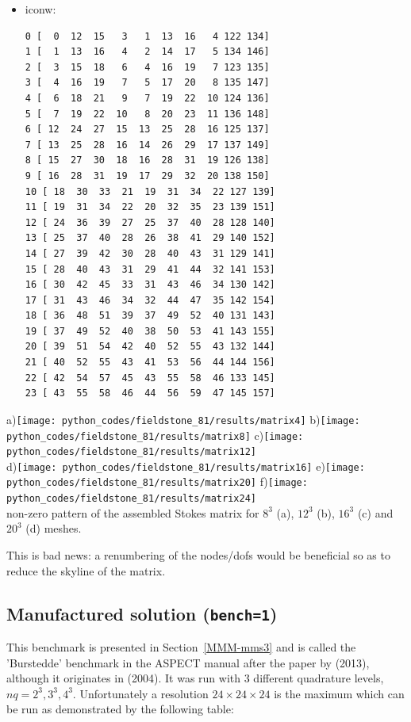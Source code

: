\begin{itemize}
\item iconw:
\begin{verbatim}
0 [  0  12  15   3   1  13  16   4 122 134]
1 [  1  13  16   4   2  14  17   5 134 146]
2 [  3  15  18   6   4  16  19   7 123 135]
3 [  4  16  19   7   5  17  20   8 135 147]
4 [  6  18  21   9   7  19  22  10 124 136]
5 [  7  19  22  10   8  20  23  11 136 148]
6 [ 12  24  27  15  13  25  28  16 125 137]
7 [ 13  25  28  16  14  26  29  17 137 149]
8 [ 15  27  30  18  16  28  31  19 126 138]
9 [ 16  28  31  19  17  29  32  20 138 150]
10 [ 18  30  33  21  19  31  34  22 127 139]
11 [ 19  31  34  22  20  32  35  23 139 151]
12 [ 24  36  39  27  25  37  40  28 128 140]
13 [ 25  37  40  28  26  38  41  29 140 152]
14 [ 27  39  42  30  28  40  43  31 129 141]
15 [ 28  40  43  31  29  41  44  32 141 153]
16 [ 30  42  45  33  31  43  46  34 130 142]
17 [ 31  43  46  34  32  44  47  35 142 154]
18 [ 36  48  51  39  37  49  52  40 131 143]
19 [ 37  49  52  40  38  50  53  41 143 155]
20 [ 39  51  54  42  40  52  55  43 132 144]
21 [ 40  52  55  43  41  53  56  44 144 156]
22 [ 42  54  57  45  43  55  58  46 133 145]
23 [ 43  55  58  46  44  56  59  47 145 157]
\end{verbatim}

\end{itemize}


\begin{center}
a)\texttt{[image: python\_codes/fieldstone\_81/results/matrix4]}
b)\texttt{[image: python\_codes/fieldstone\_81/results/matrix8]}
c)\texttt{[image: python\_codes/fieldstone\_81/results/matrix12]}\\
d)\texttt{[image: python\_codes/fieldstone\_81/results/matrix16]}
e)\texttt{[image: python\_codes/fieldstone\_81/results/matrix20]}
f)\texttt{[image: python\_codes/fieldstone\_81/results/matrix24]}\\
{\captionfont non-zero pattern of the assembled Stokes matrix for $8^3$ (a), 
$12^3$ (b), $16^3$ (c) and $20^3$ (d) meshes.}
\end{center}
This is bad news: a renumbering of the nodes/dofs would be beneficial so as to reduce the 
skyline of the matrix. 

\subsection*{Manufactured solution ({\tt bench=1})}

This benchmark is presented in Section~\ref{MMM-mms3} and is called the 
'Burstedde' benchmark in the ASPECT manual after 
the paper by \textcite{busa13} (2013), although it originates in \textcite{dobo04} (2004). 
It was run with 3 different quadrature levels, $nq=2^3,3^3,4^3$. 
Unfortunately a resolution $24\times 24\times 24$ is the maximum which can be run as demonstrated 
by the following table:

